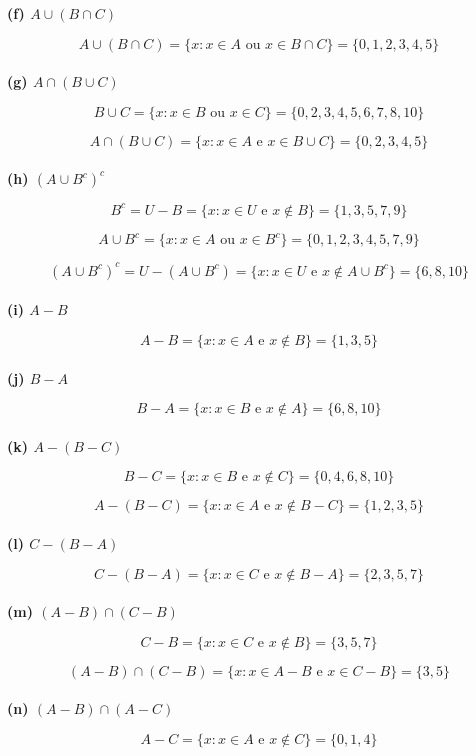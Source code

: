 \documentclass[12pt, a4paper]{article}
\begin{document}
\textbf{(f) \(A \cup (B \cap C)\)} 

\[A \cup (B \cap C) = \{x: x \in A \text{ ou } x \in B \cap C\} = \{0,1,2,3,4,5\}\] \\


\textbf{(g) \(A \cap (B \cup C)\)} 

\[B \cup C =  \{x: x \in B \text{ ou } x \in C\} = \{0,2,3,4,5,6,7,8,10\}\]

\[A \cap (B \cup C) = \{x: x \in A \text{ e } x \in B \cup C\} = \{0,2,3,4,5\}\] \\


\textbf{(h) \((A \cup B^c)^c \)} 

\[B^c  = U - B =  \{x: x \in U \text{ e } x \notin B\} = \{1,3,5,7,9\}\] 

\[A \cup B^c = \{x:x \in A \text{ ou } x \in B^c\} = \{0,1,2,3,4,5,7,9\}\] 

\[(A \cup B^c)^c = U - (A \cup B^c) = \{x: x \in U \text{ e } x \notin A \cup B^c\} = \{6, 8, 10\}\] \\


\textbf{(i) \(A - B\)} 

\[A- B =  \{x: x \in A \text{ e } x \notin B\} = \{1, 3, 5\}\] \\ 


\textbf{(j) \(B - A\)} 

\[B - A =  \{x: x \in B \text{ e } x \notin A\} = \{6, 8, 10\}\] \\

\textbf{(k) \(A - (B-C)\)} 

\[B-C =  \{x: x \in B \text{ e } x \notin C\} = \{0,4,6,8,10\}\]

\[A - (B-C) = \{x: x \in A \text{ e } x \notin B-C\} = \{1, 2, 3, 5\}\] \\

\textbf{(l) \(C - (B-A)\)} 

\[C - (B-A) =  \{x: x \in C \text{ e } x \notin B-A\} = \{2,3,5,7\}\] \\

\textbf{(m) \((A - B) \cap (C - B)\)} 

\[C-B = \{x: x \in C \text{ e } x \notin B\} = \{3, 5, 7\}\]

\[(A-B) \cap (C - B) = \{x: x \in A-B \text{ e } x \in C - B\} = \{3,5\}\] \\

\textbf{(n) \((A - B) \cap (A - C)\)}

\[A - C = \{x: x \in A \text{ e } x \notin C\} = \{0, 1, 4\}\]
\end{document}
